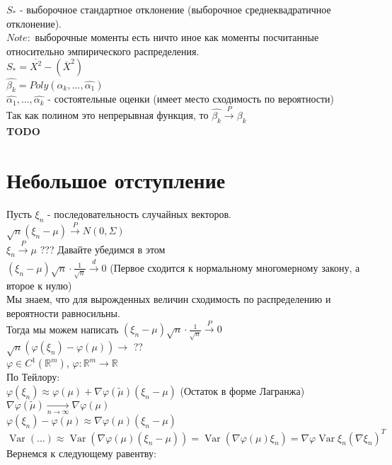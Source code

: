 \documentclass{article}
\newcommand\0{\mathbb{0}}
\DeclareMathOperator{\Var}{Var}
\newcommand\1{\mathbb{1}}
\begin{document}
$S_{*}$ - выборочное стандартное отклонение (выборочное среднеквадратичное отклонение).\\
$Note:$ выборочные моменты есть ничто иное как моменты посчитанные относительно эмпирического распределения.\\
$S_{*} = \overline{X^2} - (\overline{X}^2)$\\
$\widehat{\beta_k} = Poly(\widehat{\alpha_k}, \dots, \widehat{\alpha_1})$\\
$\widehat{\alpha_1}, \dots, \widehat{\alpha_k}$ - состоятельные оценки (имеет место сходимость по вероятности)\\
Так как полином это непрерывная функция, то $\widehat{\beta_k} \xrightarrow[]{P} \beta_k$\\
\textbf{TODO}
\section{Небольшое отступление}
Пусть $\xi_n$ - последовательность случайных векторов.\\
$\sqrt{n}(\xi_n - \mu) \xrightarrow[]{P} N(0, \Sigma)$\\
$\xi_n \xrightarrow[]{P} \mu$ ??? Давайте убедимся в этом\\
    $(\xi_n - \mu)\sqrt{n} \cdot \frac{1}{\sqrt{n}} \xrightarrow[]{d} 0$ (Первое сходится к нормальному многомерному закону, а второе к нулю)\\
    Мы знаем, что для вырожденных величин сходимость по распределению и вероятности равносильны.\\
    Тогда мы можем написать $(\xi_n - \mu)\sqrt{n} \cdot \frac{1}{\sqrt{n}} \xrightarrow[]{P} 0$\\
    $\sqrt{n}(\varphi(\xi_n) - \varphi(\mu)) \to$ ??\\
    $\varphi \in C^1(\mathbb{R}^m)$, $\varphi: \mathbb{R}^m \to \mathbb{R}$\\
    По Тейлору:\\
    $\varphi(\xi_n) \approx \varphi(\mu) + \nabla \varphi(\widetilde{\mu})(\xi_n - \mu)$ (Остаток в форме Лагранжа)\\
    $\nabla \varphi(\widetilde{\mu}) \xrightarrow[n \to \infty]{} \nabla \varphi(\mu)$\\
    $\varphi(\xi_n) - \varphi(\mu) \approx \nabla \varphi(\mu)(\xi_n - \mu)$\\
    $\Var(\dots) \approx \Var(\nabla \varphi(\mu)(\xi_n - \mu)) = \Var(\nabla \varphi(\mu) \xi_n) = \nabla \varphi \Var \xi_n (\nabla \xi_n)^T$\\
    Вернемся к следующему равентву:\\
\end{document}
